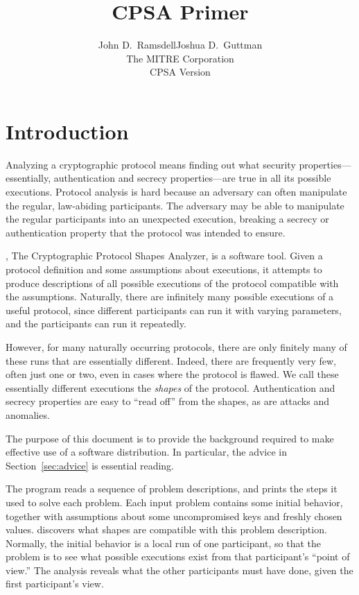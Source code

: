 \documentclass[12pt]{article}
\title{CPSA Primer}
\author{John D.~Ramsdell\qquad Joshua D.~Guttman\\
  The MITRE Corporation\\ CPSA Version \version}
\begin{document}
\maketitle
\cpsacopying

\tableofcontents

\listoffigures

\listoftables

\newpage

\section{Introduction}

\begin{sloppypar}
Analyzing a cryptographic protocol means finding out what security
properties---essentially, authentication and secrecy properties---are
true in all its possible executions.  Protocol analysis is hard
because an adversary can often manipulate the regular, law-abiding
participants.  The adversary may be able to manipulate the regular
participants into an unexpected execution, breaking a secrecy or
authentication property that the protocol was intended to ensure.
\end{sloppypar}

{\cpsa}, The Cryptographic Protocol Shapes Analyzer, is a software
tool.  Given a protocol definition and some assumptions about
executions, it attempts to produce descriptions of all possible
executions of the protocol compatible with the assumptions.
Naturally, there are infinitely many possible executions of a useful
protocol, since different participants can run it with varying
parameters, and the participants can run it repeatedly.

However, for many naturally occurring protocols, there are only
finitely many of these runs that are essentially different.  Indeed,
there are frequently very few, often just one or two, even in cases
where the protocol is flawed.  We call these essentially different
executions the \emph{shapes} of the protocol.  Authentication and
secrecy properties are easy to ``read off'' from the shapes, as are
attacks and anomalies.

The purpose of this document is to provide the background required to
make effective use of a {\cpsa} software distribution.  In particular,
the advice in Section~\ref{sec:advice} is essential reading.

The {\cpsa} program reads a sequence of problem descriptions, and
prints the steps it used to solve each problem.  Each input problem
contains some initial behavior, together with assumptions about some
uncompromised keys and freshly chosen values.  {\cpsa} discovers what
shapes are compatible with this problem description.  Normally, the
initial behavior is a local run of one participant, so that the
problem is to see what possible executions exist from that
participant's ``point of view.''  The analysis reveals what the other
participants must have done, given the first participant's view.
\end{document}
